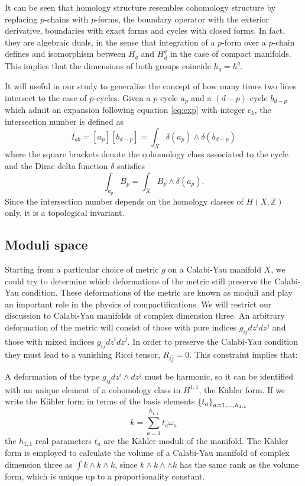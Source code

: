 It can be seen that homology structure resembles cohomology structure by replacing $p$-chains with $p$-forms, the boundary operator
with the exterior derivative, boundaries with exact forms and cycles with closed forms.
In fact, they are algebraic duals, in the sense that integration of a $p$-form over a $p$-chain
defines and isomorphism between $H_q$ and $H^q_d$ in the case of compact manifolds. 
This implies that the dimensions of both groups coincide $h_q=h^q$.

It will useful in our study to generalize the concept of how many times two lines intersect to the case of
$p$-cycles.
Given a $p$-cycle $a_p$ and a $(d-p)$-cycle $b_{d-p}$ which admit an expansion following equation \eqref{eq:exp} with integer $c_k$,
the intersection number is defined as
\begin{equation}
  I_{ab}=[a_p] [b_{d-p}] = \int_X \delta(a_p)\wedge \delta(b_{d-p})
\end{equation}
where the square brackets denote the cohomology class associated to the cycle and the Dirac delta function $\delta$ satisfies
\begin{equation}
  \int_{a_p} B_p = \int_X B_p \wedge \delta(a_p).
\end{equation}
Since the intersection number depends on the homology classes of $H(X,\mathbb Z)$ only, it is a topological invariant.

\subsection{Moduli space}

Starting from a particular choice of metric $g$ on a Calabi-Yau manifold $X$, we could try to determine
which deformations of the metric still preserve the Calabi-Yau condition.
These deformations of the metric are known as moduli and play an important role in the physics of compactifications.
We will restrict our discussion to Calabi-Yau manifolds of complex dimension three.
An arbitrary deformation of the metric will consist of those with pure 
indices $g_{ij}dz^i dz^j$ and those with mixed indices $g_{i\bar j}dz^i dz^{\bar j}$.
In order to preserve the Calabi-Yau condition they must lead to a vanishing Ricci tensor, $R_{i\bar j}=0$.
This constraint implies that:

 A deformation of the type $g_{ij}dz^i \wedge dz^j$ must be harmonic, so it can be identified with an unique element of a cohomology class in $H^{1,1}$, the Kähler form.
 If we write the Kähler form in terms of the basis elements $\qty{t_a}_{a=1,\ldots,h_{1,1}}$
\begin{equation}
k=\sum_{a=1}^{h_{1,1}}t_a \omega_a
\end{equation}
the $h_{1,1}$ real parameters $t_a$ are the Kähler moduli of the manifold.
The Kähler form is employed to calculate the volume of a Calabi-Yau manifold of complex dimension three as
$\int k\wedge k\wedge k$, since $k\wedge k\wedge \wedge k$ has the same rank as the
volume form, which is unique up to a proportionality constant.

